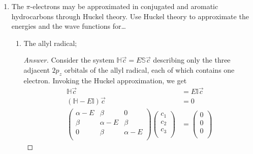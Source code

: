 \documentclass[../psets.tex]{subfiles}
\begin{document}
\begin{enumerate}
\begin{enumerate}
\begin{proof}[Answer]
            By a completely symmetric argument to part (a),
            \begin{equation*}
                \boxed{\Prob_{2p_z} = \frac{1}{4}}
            \end{equation*}
        \end{proof}
        \item By symmetry, should the results in parts (a) and (b) be the same or different?
        \begin{proof}[Answer]
            .
        \end{proof}
    \end{enumerate}
    \item The $\pi$-electrons may be approximated in conjugated and aromatic hydrocarbons through Huckel theory. Use Huckel theory to approximate the energies and the wave functions for\dots
    \begin{enumerate}
        \item The allyl radical;
        \begin{proof}[Answer]
            Consider the system $\mathbb{H}\vec{c}=E\mathbb{S}\vec{c}$ describing only the three adjacent $2p_z$ orbitals of the allyl radical, each of which contains one electron. Invoking the Huckel approximation, we get
            \begin{align*}
                \mathbb{H}\vec{c} &= E\mathbb{I}\vec{c}\\
                (\mathbb{H}-E\mathbb{I})\vec{c} &= 0\\
                \begin{pmatrix}
                    \alpha-E & \beta & 0\\
                    \beta & \alpha-E & \beta\\
                    0 & \beta & \alpha-E\\
                \end{pmatrix}
                \begin{pmatrix}
                    c_1\\
                    c_2\\
                    c_3\\
                \end{pmatrix}
                &=
                \begin{pmatrix}
                    0\\
                    0\\
                    0\\
                \end{pmatrix}

\end{align*}
\end{proof}
\end{enumerate}
\end{enumerate}
\end{document}
